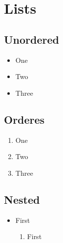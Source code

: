 \documentclass{article}
\begin{document}
\section{Lists}
\subsection{Unordered}
\begin{itemize}
    \item One
    \item Two
    \item Three
\end{itemize}

\subsection{Orderes}
\begin{enumerate}
    \item One
    \item Two
    \item Three
\end{enumerate}

\subsection{Nested}
\begin{itemize}
    \item First
          \begin{enumerate}
              \item First
          \end{enumerate}
\end{itemize}

\newpage
\printbibliography

\begin{appendix}
    \listoffigures
    \listoftables
\end{appendix}
\newpage
\end{document}
